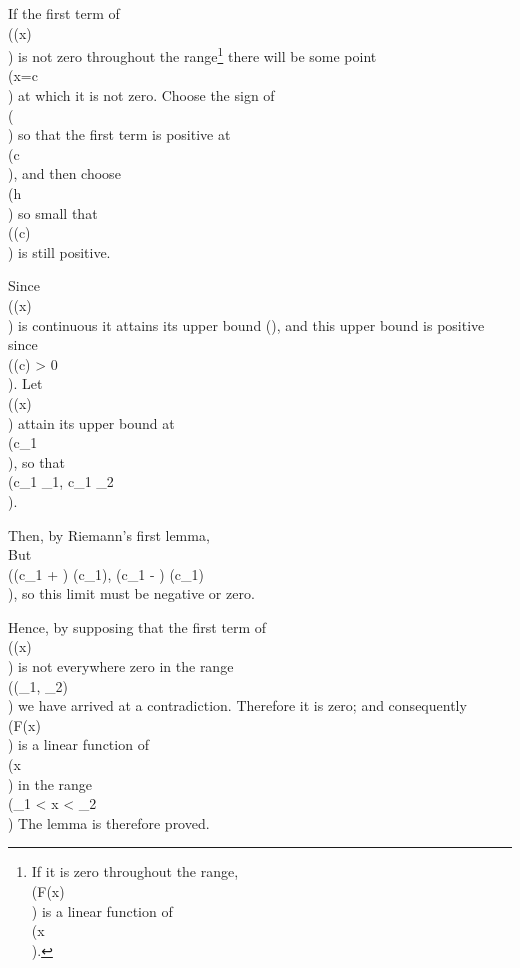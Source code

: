 If the first term of \\(\phi(x)\\) is not zero throughout the
range\footnote{If it is zero throughout the range, \\(F(x)\\)
  is a linear function of \\(x\\).}
there will be some point \\(x=c\\) at which it is not zero. Choose the sign of \\(\theta\\)
so that the first term is positive at \\(c\\), and then choose \\(h\\) so small
that \\(\phi(c)\\) is still positive.

Since \\(\phi(x)\\) is continuous it attains its upper bound (), and
this upper bound is positive since \\(\phi(c) > 0\\). Let \\(\phi(x)\\) attain its
upper bound at \\(c_{1}\\), so that \\(c_{1} \neq \xi_{1}, c_{1} \neq \xi_{2}\\).

Then, by Riemann's first
lemma,
\\[ 
\lim_{\alpha \rightarrow 0}
\frac{\phi(c_{1} + \alpha) + \phi(c_{1} - \alpha) - 2 \phi(c_{1})}{\alpha^{2}}
=
h^{2}.
\\] 

But \\(\phi(c_{1} + \alpha) \leq \phi(c_{1}), \phi(c_{1} - \alpha) \leq \phi(c_{1})\\), so this limit must be
negative or zero.

Hence, by supposing that the first term of \\(\phi(x)\\) is not everywhere zero
in the range \\((\xi_{1}, \xi_{2})\\) we have arrived at a contradiction. Therefore it
is zero; and consequently \\(F(x)\\) is a linear function of \\(x\\) in the range
\\(\xi_{1} < x < \xi_{2}\\)
The lemma is therefore proved.

